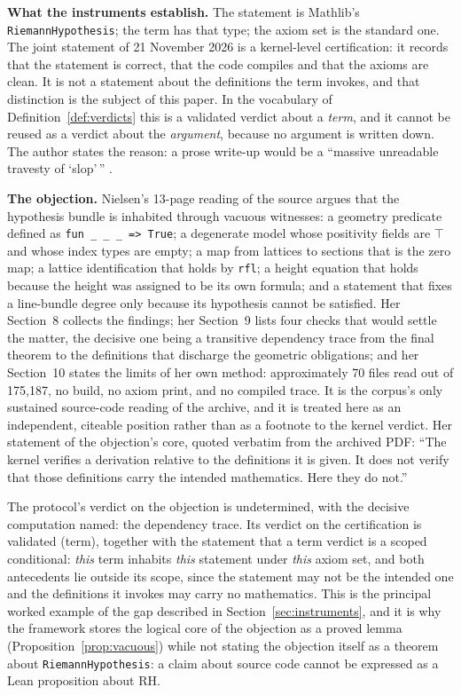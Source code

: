 \documentclass[11pt,a4paper]{article}
\newcommand{\RH}{\mathrm{RH}}
\newcommand{\verdict}[1]{\textsf{#1}}
\begin{document}
\textbf{What the instruments establish.} The statement is Mathlib's
\texttt{RiemannHypothesis}; the term has that type; the axiom set is the standard one. The joint
statement of 21 November 2026 is a kernel-level certification: it records that the statement is
correct, that the code compiles and that the axioms are clean. It is not a statement about the
definitions the term invokes, and that distinction is the subject of this paper. In the
vocabulary of Definition~\ref{def:verdicts} this is a \verdict{validated} verdict about a
\emph{term}, and it cannot be reused as a verdict about the \emph{argument}, because no argument is
written down. The author states the reason: a prose write-up would be a ``massive unreadable
travesty of `slop'\,'' \cite{alpoge}.

\textbf{The objection.} Nielsen's 13-page reading of the source \cite{nielsen} argues
that the hypothesis bundle is inhabited through vacuous witnesses: a geometry predicate defined as
\texttt{fun \_ \_ \_ => True}; a degenerate model whose positivity fields are $\top$ and whose
index types are empty; a map from lattices to sections that is the zero map; a lattice
identification that holds by \texttt{rfl}; a height equation that holds because the height was
assigned to be its own formula; and a statement that fixes a line-bundle degree only because its
hypothesis cannot be satisfied. Her Section~8 collects the findings; her Section~9 lists four
checks that would settle the matter, the decisive one being a transitive dependency trace from the
final theorem to the definitions that discharge the geometric obligations; and her Section~10
states the limits of her own method: approximately 70 files read out of 175{,}187, no build, no
axiom print, and no compiled trace. It is the corpus's only sustained source-code reading of the
archive, and it is treated here as an independent, citeable position rather than as a footnote to
the kernel verdict. Her statement of the objection's core, quoted verbatim from the archived PDF:
``The kernel verifies a derivation relative to the definitions it is given. It does not verify that
those definitions carry the intended mathematics. Here they do not.''

The protocol's verdict on the objection is \verdict{undetermined}, with the decisive
computation named: the dependency trace. Its verdict on the certification is
\verdict{validated (term)}, together with the statement that a term verdict is a scoped
conditional: \emph{this} term
inhabits \emph{this} statement under \emph{this} axiom set, and both antecedents lie outside its
scope, since the statement may not be the intended one and the definitions it invokes may carry no
mathematics. This is the principal worked example of the gap described in
Section~\ref{sec:instruments}, and it is why the framework stores the logical core of the objection
as a proved lemma (Proposition~\ref{prop:vacuous}) while not stating the objection itself as a
theorem about \texttt{RiemannHypothesis}: a claim about source code cannot be expressed as a Lean
proposition about $\RH$.
\end{document}
